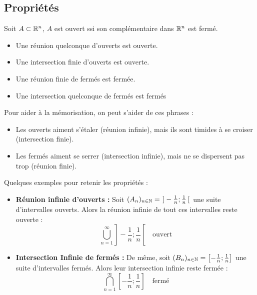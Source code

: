 \subsection{Propriétés}

\begin{proposition}
    Soit $A \subset \mathbb{R}^n$, $A$ est ouvert ssi son complémentaire dans $\mathbb{R}^n$ est fermé. 
\end{proposition}

\begin{prop}
    \begin{itemize}
        \item Une réunion quelconque d'ouverts est ouverte.
        \item Une intersection finie d'ouverts est ouverte.
        \item Une réunion finie de fermés est fermée.
        \item Une intersection quelconque de fermés est fermés
    \end{itemize}
\end{prop}

\begin{remark}
    Pour aider à la mémorisation, on peut s'aider de ces phrases :
    \begin{itemize}
        \item Les ouverts aiment s’étaler (réunion infinie), mais ils sont timides à se croiser (intersection finie).
        \item Les fermés aiment se serrer (intersection infinie), mais ne se dispersent pas trop (réunion finie).
    \end{itemize}
\end{remark}

\begin{example}
    Quelques exemples pour retenir les propriétés :
    \begin{itemize}
        \item \textbf{Réunion infinie d'ouverts : } Soit $(A_n)_{n \in \mathbb{N}} = \left. \right] -\frac{1}{n}; \frac{1}{n} \left[ \right. $ une suite d'intervalles ouverts. 
        Alors la réunion infinie de tout ces intervalles reste ouverte :
            \[ \bigcup_{n = 1}^\infty  \left. \right] -\frac{1}{n}; \frac{1}{n} \left[ \right.  \quad \text{ouvert}\] 
        \item \textbf{Intersection Infinie de fermés : } De même, soit $(B_n)_{n \in \mathbb{N}} =  \left[-\frac{1}{n}; \frac{1}{n} \right]$
        une suite d'intervalles fermés. Alors leur intersection infinie reste fermée :
            \[ \bigcap_{n = 1}^\infty  \left[-\frac{1}{n}; \frac{1}{n} \right] \quad \text{fermé}\]
    \end{itemize}
\end{example}

